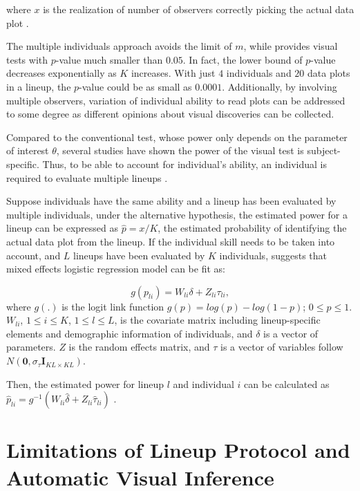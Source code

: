 \documentclass{monashthesis}
\theoremstyle{definition}
\theoremstyle{definition}
\theoremstyle{definition}
\theoremstyle{definition}
\theoremstyle{remark}
\begin{document}
where \(x\) is the realization of number of observers correctly picking the actual data plot \autocite{majumder_validation_2013}.

The multiple individuals approach avoids the limit of \(m\), while provides visual tests with \(p\)-value much smaller than \(0.05\). In fact, the lower bound of \(p\)-value decreases exponentially as \(K\) increases. With just \(4\) individuals and \(20\) data plots in a lineup, the \(p\)-value could be as small as \(0.0001\). Additionally, by involving multiple observers, variation of individual ability to read plots can be addressed to some degree as different opinions about visual discoveries can be collected.

Compared to the conventional test, whose power only depends on the parameter of interest \(\theta\), several studies \autocites[see][]{hofmann_graphical_2012,majumder_validation_2013,majumder_human_2014,roy_chowdhury_using_2015,loy_variations_2016} have shown the power of the visual test is subject-specific. Thus, to be able to account for individual's ability, an individual is required to evaluate multiple lineups \autocite{majumder_validation_2013}.

Suppose individuals have the same ability and a lineup has been evaluated by multiple individuals, under the alternative hypothesis, the estimated power for a lineup can be expressed as \(\hat{p} = x/K\), the estimated probability of identifying the actual data plot from the lineup. If the individual skill needs to be taken into account, and \(L\) lineups have been evaluated by \(K\) individuals, \textcite{majumder_validation_2013} suggests that mixed effects logistic regression model can be fit as:

\[g(p_{li}) = W_{li}\delta + Z_{li}\tau_{li},\]
where \(g(.)\) is the logit link function \(g(p) = log(p) - log(1-p)\); \(0 \leq p \leq 1\). \(W_{li}\), \(1 \leq i \leq K\), \(1 \leq l \leq L\), is the covariate matrix including lineup-specific elements and demographic information of individuals, and \(\delta\) is a vector of parameters. \(Z\) is the random effects matrix, and \(\tau\) is a vector of variables follow \(N(\boldsymbol{0},\sigma_{\tau}\boldsymbol{I}_{KL\times KL})\).

Then, the estimated power for lineup \(l\) and individual \(i\) can be calculated as \(\hat{p}_{li} = g^{-1}(W_{li}\hat{\delta} + Z_{li}\hat{\tau}_{li})\) \autocite{majumder_validation_2013}.

\hypertarget{se:limitation}{%
\section{Limitations of Lineup Protocol and Automatic Visual Inference}\label{se:limitation}}
\end{document}
